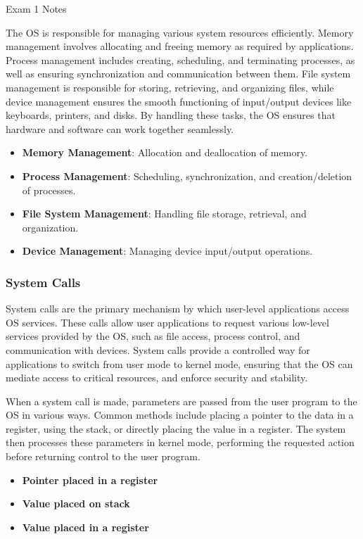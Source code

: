 \begin{examnotes}{Exam 1 Notes}
    \begin{highlight}[OS Responsibilities]
        The OS is responsible for managing various system resources efficiently. Memory management involves allocating and freeing memory as required by applications. Process management includes creating, 
        scheduling, and terminating processes, as well as ensuring synchronization and communication between them. File system management is responsible for storing, retrieving, and organizing files, 
        while device management ensures the smooth functioning of input/output devices like keyboards, printers, and disks. By handling these tasks, the OS ensures that hardware and software can work together seamlessly.
        \begin{itemize}
            \item \textbf{Memory Management}: Allocation and deallocation of memory.
            \item \textbf{Process Management}: Scheduling, synchronization, and creation/deletion of processes.
            \item \textbf{File System Management}: Handling file storage, retrieval, and organization.
            \item \textbf{Device Management}: Managing device input/output operations.
        \end{itemize}
    \end{highlight}
    
    \subsubsection*{System Calls}
    
    System calls are the primary mechanism by which user-level applications access OS services. These calls allow user applications to request various low-level services provided by the OS, such as 
    file access, process control, and communication with devices. System calls provide a controlled way for applications to switch from user mode to kernel mode, ensuring that the OS can mediate 
    access to critical resources, and enforce security and stability.
    
    \begin{highlight}
        When a system call is made, parameters are passed from the user program to the OS in various ways. Common methods include placing a pointer to the data in a register, using the stack, or directly 
        placing the value in a register. The system then processes these parameters in kernel mode, performing the requested action before returning control to the user program.
        \begin{itemize}
            \item \textbf{Pointer placed in a register}
            \item \textbf{Value placed on stack}
            \item \textbf{Value placed in a register}
        \end{itemize}
    \end{highlight}
    

\end{examnotes}
